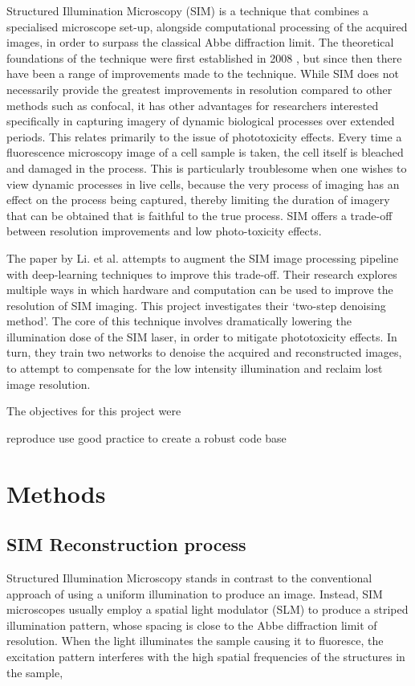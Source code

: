 \documentclass[12pt]{article}
\begin{document}
Structured Illumination Microscopy (SIM) is a technique that combines a specialised microscope set-up,
alongside computational processing of the acquired images,
in order to surpass the classical Abbe diffraction limit.
The theoretical foundations of the technique were first established in 2008 \cite{originalSIM},
but since then there have been a range of improvements made to the technique.
While SIM does not necessarily provide the greatest improvements in resolution compared to other methods such as confocal,
it has other advantages for researchers interested specifically in capturing imagery of dynamic biological processes over extended periods.
This relates primarily to the issue of phototoxicity effects.
Every time a fluorescence microscopy image of a cell sample is taken, the cell itself is bleached and damaged in the process.
This is particularly troublesome when one wishes to view dynamic processes in live cells,
because the very process of imaging has an effect on the process being captured,
thereby limiting the duration of imagery that can be obtained that is faithful to the true process.
SIM offers a trade-off between resolution improvements and low photo-toxicity effects.

The paper by Li. et al. \cite{keypaper} attempts to augment the SIM image processing pipeline with deep-learning techniques to improve this trade-off.
Their research explores multiple ways in which hardware and computation can be used to improve the resolution of SIM imaging.
This project investigates their `two-step denoising method'.
The core of this technique involves dramatically lowering the illumination dose of the SIM laser,
in order to mitigate phototoxicity effects.
In turn, they train two networks to denoise the acquired and reconstructed images,
to attempt to compensate for the low intensity illumination and reclaim lost image resolution.

The objectives for this project were

reproduce
use good practice to create a robust code base

\section{Methods}

\subsection{SIM Reconstruction process}

Structured Illumination Microscopy stands in contrast to the conventional approach of using a uniform illumination to produce an image.
Instead, SIM microscopes usually employ a spatial light modulator (SLM) to produce a striped illumination pattern,
whose spacing is close to the Abbe diffraction limit of resolution.
When the light illuminates the sample causing it to fluoresce,
the excitation pattern interferes with the high spatial frequencies of the structures in the sample,
\end{document}
